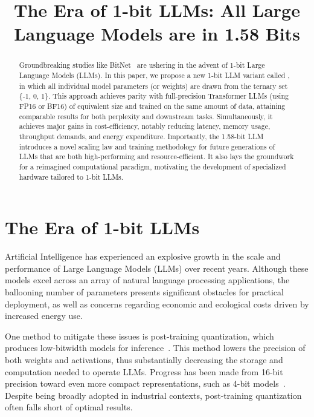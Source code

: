 \title{The Era of 1-bit LLMs: All Large Language Models are in 1.58 Bits}

\begin{abstract}
Groundbreaking studies like BitNet~\cite{bitnet} are ushering in the advent of 1-bit Large Language Models (LLMs). In this paper, we propose a new 1-bit LLM variant called \textbf{}, in which all individual model parameters (or weights) are drawn from the ternary set \{-1, 0, 1\}. This approach achieves parity with full-precision Transformer LLMs (using FP16 or BF16) of equivalent size and trained on the same amount of data, attaining comparable results for both perplexity and downstream tasks. Simultaneously, it achieves major gains in cost-efficiency, notably reducing latency, memory usage, throughput demands, and energy expenditure. Importantly, the 1.58-bit LLM introduces a novel scaling law and training methodology for future generations of LLMs that are both high-performing and resource-efficient. It also lays the groundwork for a reimagined computational paradigm, motivating the development of specialized hardware tailored to 1-bit LLMs.
\end{abstract}

\section{The Era of 1-bit LLMs}

Artificial Intelligence has experienced an explosive growth in the scale and performance of Large Language Models (LLMs) over recent years. Although these models excel across an array of natural language processing applications, the ballooning number of parameters presents significant obstacles for practical deployment, as well as concerns regarding economic and ecological costs driven by increased energy use.

One method to mitigate these issues is post-training quantization, which produces low-bitwidth models for inference~\cite{smoothquant, gptq, quip, quip_sharp}. This method lowers the precision of both weights and activations, thus substantially decreasing the storage and computation needed to operate LLMs. Progress has been made from 16-bit precision toward even more compact representations, such as 4-bit models~\cite{gptq, awq}. Despite being broadly adopted in industrial contexts, post-training quantization often falls short of optimal results.

